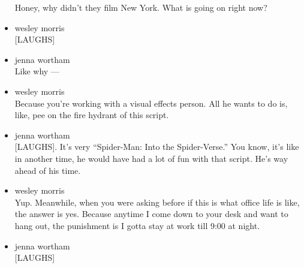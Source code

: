 \begin{itemize}
  Honey, why didn't they film New York. What is going on right now?
\item
  wesley morris\\
  {[}LAUGHS{]}
\item
  jenna wortham\\
  Like why ---
\item
  wesley morris\\
  Because you're working with a visual effects person. All he wants to
  do is, like, pee on the fire hydrant of this script.
\item
  jenna wortham\\
  {[}LAUGHS{]}. It's very ``Spider-Man: Into the Spider-Verse.'' You
  know, it's like in another time, he would have had a lot of fun with
  that script. He's way ahead of his time.
\item
  wesley morris\\
  Yup. Meanwhile, when you were asking before if this is what office
  life is like, the answer is yes. Because anytime I come down to your
  desk and want to hang out, the punishment is I gotta stay at work till
  9:00 at night.
\item
  jenna wortham\\
  {[}LAUGHS{]}


\end{itemize}

